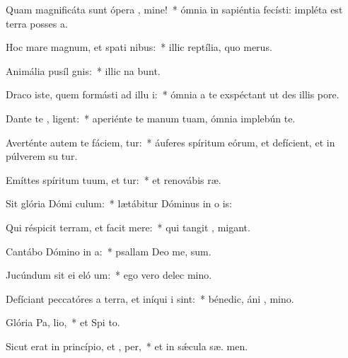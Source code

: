 \item Quam magnificáta sunt ópera , mine!~* ómnia in sapiéntia fecísti: impléta est terra posses a.
\item Hoc mare magnum, et spati nibus:~* illic reptília, quo   merus.
\item Animália pusíl  gnis:~* illic na bunt.
\item Draco iste, quem formásti ad illu i:~* ómnia a te exspéctant ut des illis   pore.
\item Dante te , ligent:~* aperiénte te manum tuam, ómnia implebún te.
\item Averténte autem te fáciem, tur:~* áuferes spíritum eórum, et defícient, et in púlverem su tur.
\item Emíttes spíritum tuum, et tur:~* et renovábis  ræ.
\item Sit glória Dómi  culum:~* lætábitur Dóminus in o is:
\item Qui réspicit terram, et facit  mere:~* qui tangit ,  migant.
\item Cantábo Dómino in  a:~* psallam Deo me,  sum.
\item Jucúndum sit ei eló um:~* ego vero delec  mino.
\item Defíciant peccatóres a terra, et iníqui i   sint:~* bénedic, áni , mino.
\item Glória Pa,  lio,~* et Spi to.
\item Sicut erat in princípio, et ,  per,~* et in sǽcula sæ. men.
